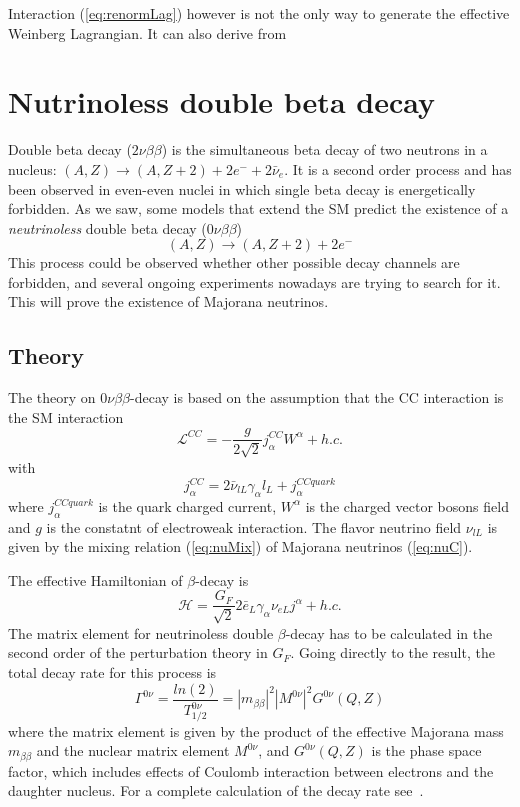 \documentclass{subnucbo}
\begin{document}
Interaction (\ref{eq:renormLag}) however is not the only way to generate the effective Weinberg Lagrangian. It can also derive from 

\section{Nutrinoless double beta decay}
Double beta decay ($2\nu\beta\beta$) is the simultaneous beta decay of two neutrons in a nucleus: $(A, Z)\rightarrow(A, Z+2)+2e^-+2\bar{\nu}_e$.
It is a second order process and has been observed in even-even nuclei in which single beta decay is energetically forbidden. As we saw, some models that extend the SM predict the existence of a \emph{neutrinoless} double beta decay ($0\nu\beta\beta$)
\begin{equation}
(A, Z)\rightarrow(A, Z+2)+2e^-
\end{equation}
This process could be observed whether other possible decay channels are forbidden, and several ongoing experiments nowadays are trying to search for it. This will prove the existence of Majorana neutrinos.

\subsection{Theory}
The theory on $0\nu\beta\beta$-decay is based on the assumption that the CC interaction is the SM interaction
\begin{equation}
\mathcal{L}^{CC}=-\frac{g}{2\sqrt{2}}j_{\alpha}^{CC}W^{\alpha}+h.c.
\end{equation}
with
\begin{equation}
j_{\alpha}^{CC}=2\bar{\nu}_{lL}\gamma_{\alpha}l_L+j_{\alpha}^{CCquark}
\end{equation}
where $j_{\alpha}^{CCquark}$ is the quark charged current, $W^{\alpha}$ is the charged vector bosons field and $g$ is the constatnt of electroweak interaction. The flavor neutrino field $\nu_{lL}$ is given by the mixing relation (\ref{eq:nuMix}) of Majorana neutrinos (\ref{eq:nuC}).

The effective Hamiltonian of $\beta$-decay is 
\begin{equation}
\mathcal{H}=\frac{G_F}{\sqrt{2}}2\bar{e}_L\gamma_{\alpha}\nu_{eL}j^{\alpha}+h.c.
\end{equation}
The matrix element for neutrinoless double $\beta$-decay has to be calculated in the second order of the perturbation theory in $G_F$. Going directly to the result, the total decay rate for this process is
\begin{equation}
\Gamma^{0\nu}=\frac{ln(2)}{T^{0\nu}_{1/2}}=|m_{\beta\beta}|^2|M^{0\nu}|^2G^{0\nu}(Q,Z)
\end{equation}
where the matrix element is given by the product of the effective Majorana mass $m_{\beta\beta}$ and the nuclear matrix element $M^{0\nu}$, and $G^{0\nu}(Q,Z)$ is the phase space factor, which includes effects of Coulomb interaction between electrons and the daughter nucleus. For a complete calculation of the decay rate see~\cite{ref:Bil}.
\end{document}
